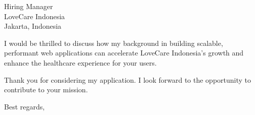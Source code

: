 \documentclass[11pt,a4paper]{letter}
\begin{document}
\begin{letter}{%
    Hiring Manager \\
    LoveCare Indonesia \\
    Jakarta, Indonesia
}
\vspace{10pt}

I would be thrilled to discuss how my background in building scalable, performant web applications can accelerate LoveCare Indonesia's growth and enhance the healthcare experience for your users.

\vspace{10pt}

Thank you for considering my application. I look forward to the opportunity to contribute to your mission.

\closing{Best regards,}

\end{letter}
\end{document}
